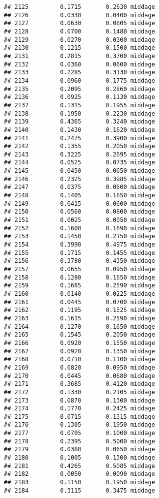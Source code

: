 \documentclass[
]{article}
\begin{document}
\begin{verbatim}
## 2125         0.1715       0.2630 middage
## 2126         0.0330       0.0400 middage
## 2127         0.0630       0.0805 middage
## 2128         0.0700       0.1480 middage
## 2129         0.0270       0.0300 middage
## 2130         0.1215       0.1500 middage
## 2131         0.2815       0.3700 middage
## 2132         0.0360       0.0600 middage
## 2133         0.2285       0.3130 middage
## 2134         0.0960       0.1775 middage
## 2135         0.2095       0.2860 middage
## 2136         0.0925       0.1130 middage
## 2137         0.1315       0.1955 middage
## 2138         0.1950       0.2230 middage
## 2139         0.4365       0.3240 middage
## 2140         0.1430       0.1620 middage
## 2141         0.2475       0.3900 middage
## 2142         0.1355       0.2050 middage
## 2143         0.3225       0.2695 middage
## 2144         0.0525       0.0735 middage
## 2145         0.0450       0.0650 middage
## 2146         0.2325       0.3985 middage
## 2147         0.0375       0.0600 middage
## 2148         0.1405       0.1850 middage
## 2149         0.0415       0.0600 middage
## 2150         0.0560       0.0800 middage
## 2151         0.0025       0.0050 middage
## 2152         0.1600       0.1690 middage
## 2153         0.1450       0.2150 middage
## 2154         0.3990       0.4975 middage
## 2155         0.1715       0.1455 middage
## 2156         0.3780       0.4350 middage
## 2157         0.0655       0.0950 middage
## 2158         0.1280       0.1650 middage
## 2159         0.1685       0.2590 middage
## 2160         0.0140       0.0225 middage
## 2161         0.0445       0.0700 middage
## 2162         0.1195       0.1525 middage
## 2163         0.1615       0.2590 middage
## 2164         0.1270       0.1650 middage
## 2165         0.1545       0.2050 middage
## 2166         0.0920       0.1550 middage
## 2167         0.0920       0.1350 middage
## 2168         0.0710       0.1100 middage
## 2169         0.0820       0.0950 middage
## 2170         0.0445       0.0680 middage
## 2171         0.3685       0.4120 middage
## 2172         0.1330       0.2105 middage
## 2173         0.0870       0.1300 middage
## 2174         0.1770       0.2425 middage
## 2175         0.0715       0.1315 middage
## 2176         0.1305       0.1950 middage
## 2177         0.0705       0.1000 middage
## 2178         0.2395       0.5000 middage
## 2179         0.0380       0.0650 middage
## 2180         0.1005       0.1300 middage
## 2181         0.4265       0.5085 middage
## 2182         0.0050       0.0090 middage
## 2183         0.1150       0.1950 middage
## 2184         0.3115       0.3475 middage

\end{verbatim}
\end{document}
